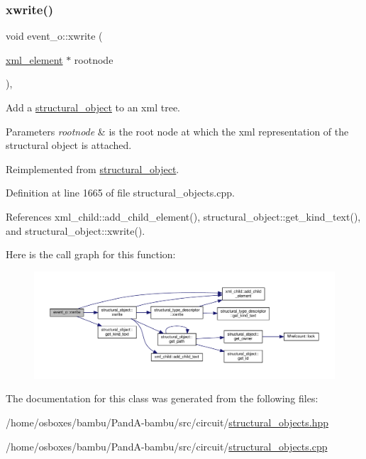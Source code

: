 \subsubsection{\texorpdfstring{xwrite()}{xwrite()}}
{\footnotesize\ttfamily void event\+\_\+o\+::xwrite (\begin{DoxyParamCaption}\item[{\hyperlink{classxml__element}{xml\+\_\+element} $\ast$}]{rootnode }\end{DoxyParamCaption})\hspace{0.3cm}{\ttfamily [override]}, {\ttfamily [virtual]}}



Add a \hyperlink{classstructural__object}{structural\+\_\+object} to an xml tree. 


\begin{DoxyParams}{Parameters}
{\em rootnode} & is the root node at which the xml representation of the structural object is attached. \\
\hline
\end{DoxyParams}


Reimplemented from \hyperlink{classstructural__object_a7b0b509094451578b2dc10a9b716b16e}{structural\+\_\+object}.



Definition at line 1665 of file structural\+\_\+objects.\+cpp.



References xml\+\_\+child\+::add\+\_\+child\+\_\+element(), structural\+\_\+object\+::get\+\_\+kind\+\_\+text(), and structural\+\_\+object\+::xwrite().

Here is the call graph for this function\+:
\nopagebreak
\begin{figure}[H]
\begin{center}
\leavevmode
\includegraphics[width=350pt]{d9/db0/classevent__o_a53240cc7c1bee201e995d027908afec9_cgraph}
\end{center}
\end{figure}


The documentation for this class was generated from the following files\+:\begin{DoxyCompactItemize}
\item 
/home/osboxes/bambu/\+Pand\+A-\/bambu/src/circuit/\hyperlink{structural__objects_8hpp}{structural\+\_\+objects.\+hpp}\item 
/home/osboxes/bambu/\+Pand\+A-\/bambu/src/circuit/\hyperlink{structural__objects_8cpp}{structural\+\_\+objects.\+cpp}\end{DoxyCompactItemize}
